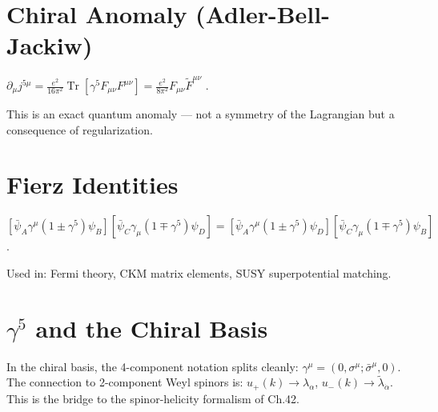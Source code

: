 \documentclass[12pt]{article}
\DeclareMathOperator\Tr{Tr}
\begin{document}
\section{Chiral Anomaly (Adler-Bell-Jackiw)}
\begin{mdframed}
$\displaystyle\partial_\mu j^{5\mu}
= \frac{e^2}{16\pi^2}\Tr[\gamma^5 F_{\mu\nu}F^{\mu\nu}]
= \frac{e^2}{8\pi^2}F_{\mu\nu}\tilde F^{\mu\nu}$ .
\end{mdframed}
This is an exact quantum anomaly --- not a symmetry of the Lagrangian
but a consequence of regularization.

\section{Fierz Identities}
\begin{mdframed}
$[\bar\psi_A\gamma^\mu(1\pm\gamma^5)\psi_B][\bar\psi_C\gamma_\mu(1\mp\gamma^5)\psi_D]
=[\bar\psi_A\gamma^\mu(1\pm\gamma^5)\psi_D][\bar\psi_C\gamma_\mu(1\mp\gamma^5)\psi_B]$ .
\end{mdframed}
Used in: Fermi theory, CKM matrix elements, SUSY superpotential matching.

\section{$\gamma^5$ and the Chiral Basis}
In the chiral basis, the 4-component notation splits cleanly:
$\gamma^\mu=(0,\sigma^\mu;\bar\sigma^\mu,0)$.
The connection to 2-component Weyl spinors is:
$u_+(k)\to\lambda_\alpha$, $u_-(k)\to\tilde\lambda_{\dot\alpha}$.
This is the bridge to the spinor-helicity formalism of Ch.42.

\vfill
\end{document}
